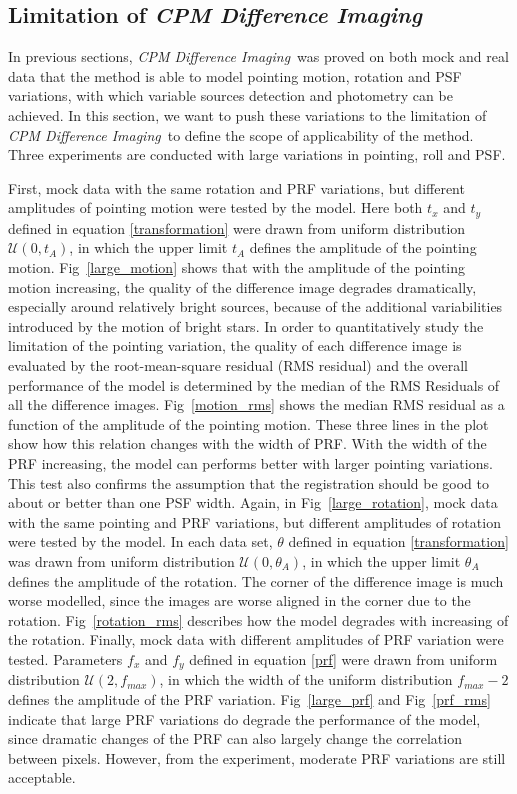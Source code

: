 \documentclass[12pt, preprint]{aastex}
\newcommand{\project}[1]{\textsl{#1}}
\newcommand{\cpmdiff}{\project{CPM Difference Imaging}}
\begin{document}
\subsection{Limitation of \cpmdiff}
In previous sections,  \cpmdiff\ was proved on both mock and real data that the method is able to model pointing motion, rotation and PSF variations, with which variable sources detection and photometry can be achieved.
In this section, we want to push these variations to the limitation of \cpmdiff\ to define the scope of applicability of the method. Three experiments are conducted with large variations in pointing, roll and PSF.

First, mock data with the same rotation and PRF variations, but different amplitudes of pointing motion were tested by the model.
Here both $t_x$ and $t_y$ defined in equation \ref{transformation} were drawn from uniform distribution ${\mathcal {U}}(0,t_A)$, in which the upper limit $t_A$ defines the amplitude of the pointing motion.
Fig~\ref{large_motion} shows that with the amplitude of the pointing motion increasing,  the quality of the difference image degrades dramatically, especially around relatively bright sources, because of the additional variabilities introduced by the motion of bright stars.
In order to quantitatively study the limitation of the pointing variation, the quality of each difference image is evaluated by the root-mean-square residual (RMS residual) and the overall performance of the model is determined by the median of the RMS Residuals of all the difference images.
Fig~\ref{motion_rms} shows the median RMS residual as a function of the amplitude of the pointing motion. 
These three lines in the plot show how this relation changes with the width of PRF.
With the width of the PRF increasing, the model can performs better with larger pointing variations.
This test also confirms the assumption that the registration should be good to about or better than one PSF width.
Again, in Fig~\ref{large_rotation}, mock data with the same pointing and PRF variations, but different amplitudes of rotation were tested by the model.
In each data set, $\theta$ defined in equation \ref{transformation} was drawn from uniform distribution ${\mathcal {U}}(0,\theta_A)$, in which the upper limit $\theta_A$ defines the amplitude of the rotation.
The corner of the difference image is much worse modelled, since the images are worse aligned in the corner due to the rotation. 
Fig~\ref{rotation_rms} describes how the model degrades with increasing of the  rotation.
Finally, mock data with different amplitudes of PRF variation were tested.
Parameters $f_x$ and $f_y$ defined in equation \ref{prf} were drawn from uniform distribution ${\mathcal {U}}(2,f_{max})$, in which the width of the uniform distribution $f_{max}-2$ defines the amplitude of the PRF variation.
Fig~\ref{large_prf} and Fig~\ref{prf_rms} indicate that large PRF variations do degrade the performance of the model, since dramatic changes of the PRF can also largely change the correlation between pixels.
However, from the experiment, moderate PRF variations are still acceptable. 
\end{document}
